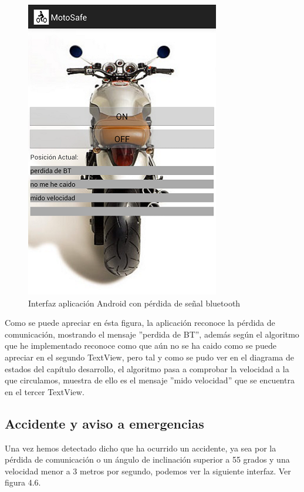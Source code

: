 		\begin{figure}[h]
			\centering
			\includegraphics{imagenes/perdidaBT.png}
			\caption{Interfaz aplicación Android con pérdida de se\~nal bluetooth}
			\label{contexto:figura}
		\end{figure}
		
		Como se puede apreciar en ésta figura, la aplicación reconoce la pérdida de comunicación, mostrando el mensaje ''perdida de BT'', además según el algoritmo que he implementado reconoce como que aún no se ha caido como se puede apreciar en el segundo TextView, pero tal y como se pudo ver en el diagrama de estados del capítulo desarrollo, el algoritmo pasa a comprobar la velocidad a la que circulamos, muestra de ello es el mensaje ''mido velocidad'' que se encuentra en el tercer TextView.
		
		\subsection{Accidente y aviso a emergencias}
		
		Una vez hemos detectado dicho que ha ocurrido un accidente, ya sea por la pérdida de comunicación o un ángulo de inclinación superior a 55 grados y una velocidad menor a 3 metros por segundo, podemos ver la siguiente interfaz. Ver figura 4.6.
		
